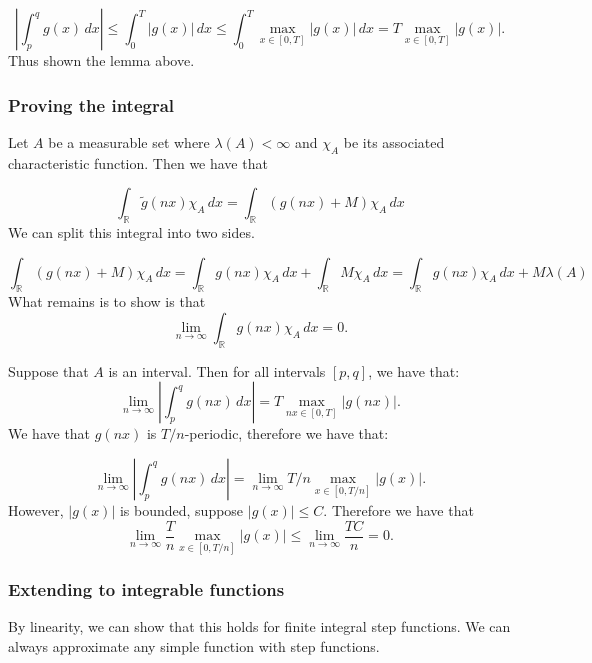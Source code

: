 \documentclass{article}
\theoremstyle{definition}
\numberwithin{theorem}{section}
\numberwithin{equation}{section}
\begin{document}
\begin{equation}
	\left| \int_{p}^{q} g(x) \, dx \right| \leq \int_{0}^T |g(x)| \, dx \leq \int_{0}^T \max_{x \in [0, T]} |g(x)| \, dx = T \max_{x \in [0, T]} |g(x)|.
\end{equation}
Thus shown the lemma above. 

\subsubsection{Proving the integral}
Let $A$ be a measurable set where $\lambda(A) < \infty$ and $\chi_A$ be its associated characteristic function. Then we have that

\begin{equation}
	\int_{\mathbb{R}} \tilde{g}(nx) \chi_A \, dx = \int_{\mathbb{R}} \left(g(nx) + M\right) \chi_A \, dx
\end{equation}
We can split this integral into two sides. 

\begin{equation}
	\int_{\mathbb{R}} \left(g(nx) + M\right) \chi_A \, dx = \int_{\mathbb{R}}  g(nx) \chi_A \, dx + \int_{\mathbb{R}} M \chi_A \, dx = \int_{\mathbb{R}}  g(nx) \chi_A \, dx + M \lambda(A)
\end{equation}
What remains is to show is that
\begin{equation}
	\lim_{n \rightarrow \infty} \int_{\mathbb{R}}  g(nx) \chi_A \, dx = 0. 
\end{equation}

Suppose that $A$ is an interval. Then for all intervals $[p, q]$, we have that:
\begin{equation}
	\lim_{n \rightarrow \infty} \left| \int_{p}^{q} g(nx) \, dx \right| = T \max_{nx \in [0, T]} |g(nx)|.
\end{equation}
We have that $g(nx)$ is $T/n$-periodic, therefore we have that:

\begin{equation}
	\lim_{n \rightarrow \infty} \left| \int_{p}^{q} g(nx) \, dx \right| =\lim_{n \rightarrow \infty}  T/n \max_{x \in [0, T/n]} |g(x)|.
\end{equation}
However, $|g(x)|$ is bounded, suppose $|g(x)| \leq C$. Therefore we have that 
\begin{equation}
	\lim_{n \rightarrow \infty} \frac{T}{n} \max_{x \in [0, T/n]} |g(x)| \leq \lim_{n \rightarrow \infty} \frac{TC}{n} = 0.
\end{equation}

\subsubsection{Extending to integrable functions}
By linearity, we can show that this holds for finite integral step functions. 
We can always approximate any simple function with step functions.
\end{document}
